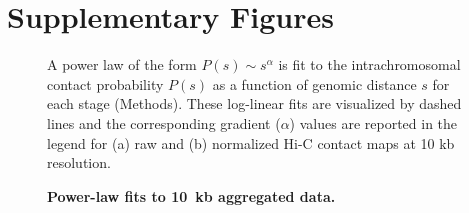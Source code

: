 \documentclass{article}
\begin{document}

\section*{Supplementary Figures}

\begin{figure}[ht!]
  \begin{center}
  \hspace{0.03\textwidth}
  \end{center}
\caption{{\bf Power-law fits to 10~kb aggregated data.}}
{ A power law of the form $P(s) \sim s^\alpha$ is fit to the intrachromosomal
    contact probability $P(s)$ as a function of genomic distance $s$ for each
    stage (Methods). These log-linear fits are visualized by dashed lines and
    the corresponding gradient ($\alpha$) values are reported in the legend
    for (a) raw and (b) normalized Hi-C contact maps at 10 kb
    resolution.
}
\label{suppfig:power-law}
\end{figure}
\clearpage
\end{document}

